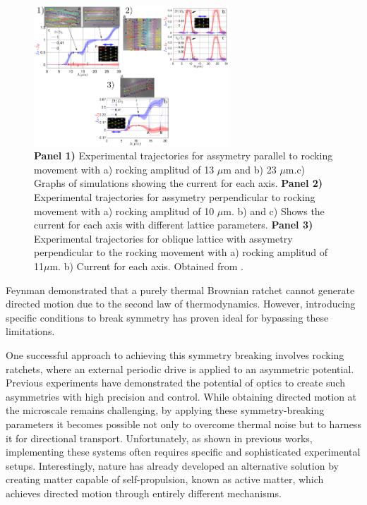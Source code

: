 \begin{figure}[h]
  \begin{center}
    \includegraphics[width=0.65\textwidth]{figures/ArzolaExperiment.png}
  \end{center}
  \caption[Arzola experiment.]{\textbf{Panel 1)} Experimental trajectories for  assymetry parallel to rocking movement with a) rocking amplitud of 13 $\mu$m and b) 23 $\mu$m.c) Graphs of simulations showing the current for each axis. \textbf{Panel 2)} Experimental trajectories for assymetry perpendicular to rocking movement with a) rocking amplitud of 10 $\mu$m. b) and c) Shows the current for each axis with different lattice parameters. \textbf{Panel 3)} Experimental trajectories for oblique lattice with assymetry perpendicular to the rocking movement with a) rocking amplitud of 11$\mu$m. b) Current for each axis. Obtained from \cite{arzola2017omnidirectional}.}\label{fig:arzolaexperiment}
\end{figure}

Feynman demonstrated that a purely thermal Brownian ratchet cannot generate directed motion due to the second law of thermodynamics. However, introducing specific conditions to break symmetry has proven ideal for bypassing these limitations.

One successful approach to achieving this symmetry breaking involves rocking ratchets, where an external periodic drive is applied to an asymmetric potential. Previous experiments have demonstrated the potential of optics to create such asymmetries with high precision and control. While obtaining directed motion at the microscale remains challenging, by applying these symmetry-breaking parameters it becomes possible not only to overcome thermal noise but to harness it for directional transport. Unfortunately, as shown in previous works, implementing these systems often requires specific and sophisticated experimental setups. Interestingly, nature has already developed an alternative solution by creating matter capable of self-propulsion, known as active matter, which achieves directed motion through entirely different mechanisms.


